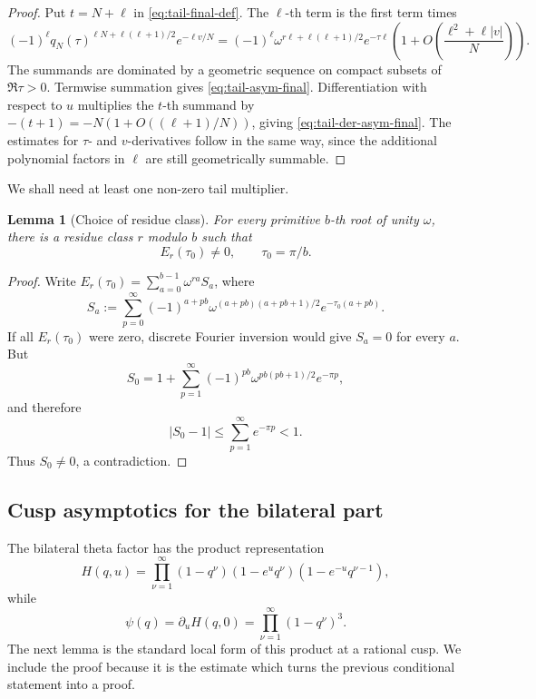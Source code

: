 \documentclass[11pt,a4paper,reqno]{amsart}
\newtheorem{lemma}[theorem]{Lemma}
\theoremstyle{remark}
\begin{document}
\begin{proof}
Put $t=N+\ell$ in \eqref{eq:tail-final-def}.  The $\ell$-th term is the first term times
\[
        (-1)^\ell q_N(\tau)^{\ell N+\ell(\ell+1)/2}e^{-\ell v/N}
        =(-1)^\ell \omega^{r\ell+\ell(\ell+1)/2}e^{-\tau\ell}
          \left(1+O\left(\frac{\ell^2+\ell |v|}{N}\right)\right).
\]
The summands are dominated by a geometric sequence on compact subsets of $\Re\tau>0$.  Termwise summation gives \eqref{eq:tail-asym-final}.  Differentiation with respect to $u$ multiplies the $t$-th summand by $-(t+1)=-N(1+O((\ell+1)/N))$, giving \eqref{eq:tail-der-asym-final}.  The estimates for $\tau$- and $v$-derivatives follow in the same way, since the additional polynomial factors in $\ell$ are still geometrically summable.
\end{proof}

We shall need at least one non-zero tail multiplier.

\begin{lemma}[Choice of residue class]\label{lem:tail-multiplier-nonzero}
For every primitive $b$-th root of unity $\omega$, there is a residue class $r$ modulo $b$ such that
\[
        E_r(\tau_0)\ne0,
        \qquad \tau_0=\pi/b.
\]
\end{lemma}

\begin{proof}
Write $E_r(\tau_0)=\sum_{a=0}^{b-1}\omega^{ra}S_a$, where
\[
        S_a:=\sum_{p=0}^{\infty}(-1)^{a+pb}
        \omega^{(a+pb)(a+pb+1)/2}e^{-\tau_0(a+pb)}.
\]
If all $E_r(\tau_0)$ were zero, discrete Fourier inversion would give $S_a=0$ for every $a$.  But
\[
        S_0=1+\sum_{p=1}^{\infty}(-1)^{pb}
        \omega^{pb(pb+1)/2}e^{-\pi p},
\]
and therefore
\[
        |S_0-1|\le \sum_{p=1}^{\infty}e^{-\pi p}<1.
\]
Thus $S_0\ne0$, a contradiction.
\end{proof}

\subsection{Cusp asymptotics for the bilateral part}
The bilateral theta factor has the product representation
\begin{equation}\label{eq:H-product-final}
        H(q,u)=\prod_{\nu=1}^{\infty}(1-q^\nu)(1-e^uq^\nu)(1-e^{-u}q^{\nu-1}),
\end{equation}
while
\[
        \psi(q)=\partial_uH(q,0)=\prod_{\nu=1}^{\infty}(1-q^\nu)^3.
\]
The next lemma is the standard local form of this product at a rational cusp.  We include the proof because it is the estimate which turns the previous conditional statement into a proof.
\end{document}
